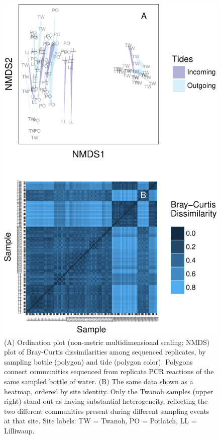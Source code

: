 \documentclass[fleqn,10pt,lineno]{wlpeerj} %
\begin{document}
\begin{figure}[!ht]

{\centering \includegraphics{figures/FIG4_multiplot_NMDS_BottleTide-1} 

}

\caption{\label{fig:fig4}(A) Ordination plot (non-metric multidimensional scaling; NMDS) plot of Bray-Curtis dissimilarities among sequenced replicates, by sampling bottle (polygon) and tide (polygon color). Polygons connect communities sequenced from replicate PCR reactions of the same sampled bottle of water. (B) The same data shown as a heatmap, ordered by site identity. Only the Twanoh samples (upper right) stand out as having substantial heterogeneity, reflecting the two different communities present during different sampling events at that site. Site labels: TW = Twanoh, PO = Potlatch, LL = Lilliwaup.}\label{fig:FIG4_multiplot_NMDS_BottleTide}
\end{figure}
\end{document}
